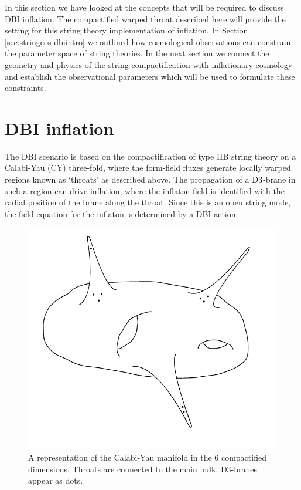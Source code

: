 In this section we have looked at the concepts that will be
required to discuss DBI inflation. The compactified warped throat described
here will provide the setting for this string theory implementation of
inflation. In Section \ref{sec:stringcos-dbiintro} we outlined how cosmological
observations can constrain the parameter space of string theories. In the next
section we connect the geometry and physics of the string compactification with
inflationary cosmology and establish the observational parameters which will be
used to formulate these constraints. 

% 
% 
\section{DBI inflation} 
% 
\label{sec:dbiinflation}
The DBI scenario is based on the compactification of type IIB string theory on a 
Calabi-Yau (CY) three-fold, where the form-field fluxes generate locally
warped regions known as `throats' as described above.  The propagation of a 
${\rm D3}$-brane in such a region can drive inflation, where the inflaton 
field is identified with the radial position of the brane 
along the throat. Since this is an open string mode, the field 
equation for the inflaton is determined by a DBI action.

% 
\begin{figure}
 \centering
 \includegraphics[width=\textwidth]{dbi/graphs/cymanifold}
 \caption{A representation of the Calabi-Yau manifold in the 6 compactified
dimensions. Throats are connected to the main bulk. D3-branes appear as dots.}
 \label{fig:braneworld}
\end{figure}
% 


